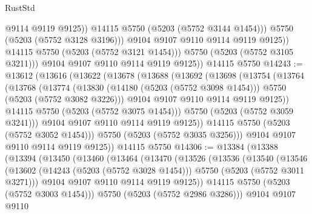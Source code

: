 \begin{lexlean}{RustStd}
\begin{coremodule}
                        @9114
                        @9119
                        @9125))
                    @14115
                    @5750
                    (@5203 (@5752 @3144 @1454)))
                  @5750
                  (@5203 (@5752 @3128 @3196)))
                @9104
                @9107
                @9110
                @9114
                @9119
                @9125))
            @14115
            @5750
            (@5203 (@5752 @3121 @1454)))
          @5750
          (@5203 (@5752 @3105 @3211)))
        @9104
        @9107
        @9110
        @9114
        @9119
        @9125))
    @14115
    @5750
@14243 := @13612
    (@13616
      (@13622
        (@13678
          (@13688
            (@13692
              (@13698
                (@13754
                  (@13764
                    (@13768
                      (@13774
                        (@13830
                          (@14180 (@5203 (@5752 @3098 @1454)))
                          @5750
                          (@5203 (@5752 @3082 @3226)))
                        @9104
                        @9107
                        @9110
                        @9114
                        @9119
                        @9125))
                    @14115
                    @5750
                    (@5203 (@5752 @3075 @1454)))
                  @5750
                  (@5203 (@5752 @3059 @3241)))
                @9104
                @9107
                @9110
                @9114
                @9119
                @9125))
            @14115
            @5750
            (@5203 (@5752 @3052 @1454)))
          @5750
          (@5203 (@5752 @3035 @3256)))
        @9104
        @9107
        @9110
        @9114
        @9119
        @9125))
    @14115
    @5750
@14306 := @13384
    (@13388
      (@13394
        (@13450
          (@13460
            (@13464
              (@13470
                (@13526
                  (@13536
                    (@13540
                      (@13546
                        (@13602
                          (@14243 (@5203 (@5752 @3028 @1454)))
                          @5750
                          (@5203 (@5752 @3011 @3271)))
                        @9104
                        @9107
                        @9110
                        @9114
                        @9119
                        @9125))
                    @14115
                    @5750
                    (@5203 (@5752 @3003 @1454)))
                  @5750
                  (@5203 (@5752 @2986 @3286)))
                @9104
                @9107
                @9110

\end{coremodule}
\end{lexlean}
